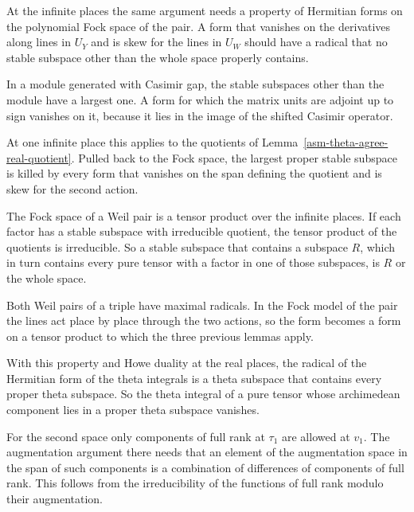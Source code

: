 At the infinite places the same argument needs a property of Hermitian forms on
the polynomial Fock space of the pair. A form that vanishes on the derivatives
along lines in $U_Y$ and is skew for the lines in $U_W$ should have a radical
that no stable subspace other than the whole space properly contains.

In a module generated with Casimir gap, the stable subspaces other than the
module have a largest one. A form for which the matrix units are adjoint up to
sign vanishes on it, because it lies in the image of the shifted Casimir
operator.

At one infinite place this applies to the quotients of
Lemma~\ref{asm-theta-agree-real-quotient}. Pulled back to the Fock space, the
largest proper stable subspace is killed by every form that vanishes on the
span defining the quotient and is skew for the second action.

The Fock space of a Weil pair is a tensor product over the infinite places.
If each factor has a stable subspace with irreducible quotient, the tensor
product of the quotients is irreducible. So a stable subspace that contains a
subspace $R$, which in turn contains every pure tensor with a factor in one of
those subspaces, is $R$ or the whole space.

Both Weil pairs of a triple have maximal radicals. In the Fock model of the
pair the lines act place by place through the two actions, so the form becomes
a form on a tensor product to which the three previous lemmas apply.

With this property and Howe duality at the real places, the radical of the
Hermitian form of the theta integrals is a theta subspace that contains every
proper theta subspace. So the theta integral of a pure tensor whose
archimedean component lies in a proper theta subspace vanishes.

For the second space only components of full rank at $\tau_1$ are allowed at
$v_1$. The augmentation argument there needs that an element of the augmentation
space in the span of such components is a combination of differences of
components of full rank. This follows from the irreducibility of the functions
of full rank modulo their augmentation.

